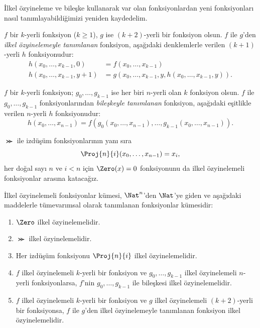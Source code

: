 \documentclass[../../../include/open-logic-section]{subfiles}
\begin{document}

İlkel özyineleme ve bileşke kullanarak var olan fonksiyonlardan yeni
fonksiyonları nasıl tanımlayabildiğimizi yeniden kaydedelim.

\begin{defn}
  $f$ bir $k$-yerli fonksiyon ($k\geq1$), $g$ ise $(k+2)$-yerli bir
  fonksiyon olsun. $f$ ile $g$'den \emph{ilkel özyinelemeyle tanımlanan}
  fonksiyon, aşağıdaki denklemlerle verilen $(k+1)$-yerli $h$ fonksiyonudur:
  \begin{align*}
    h(x_0,\dots,x_{k-1},0) & = f(x_0,\dots,x_{k-1}) \\
    h(x_0,\dots,x_{k-1},y+1) & =
      g(x_0,\dots,x_{k-1},y,h(x_0,\dots,x_{k-1},y)).
  \end{align*}
\end{defn}

\begin{defn}
  $f$ bir $k$-yerli fonksiyon; $g_0,\dots,g_{k-1}$ ise her biri $n$-yerli
  olan $k$ fonksiyon olsun. $f$ ile $g_0,\dots,g_{k-1}$ fonksiyonlarından
  \emph{bileşkeyle tanımlanan} fonksiyon, aşağıdaki eşitlikle verilen
  $n$-yerli $h$ fonksiyonudur:
  \[
    h(x_0,\dots,x_{n-1})=
    f(g_0(x_0,\dots,x_{n-1}),\dots,g_{k-1}(x_0,\dots,x_{n-1})).
  \]
\end{defn}

$\Succ$ ile izdüşüm fonksiyonlarının yanı sıra
\[
  \Proj{n}{i}(x_0,\dots,x_{n-1})=x_i,
\]
her doğal sayı $n$ ve $i<n$ için $\Zero(x)=0$ fonksiyonunu da ilkel
özyinelemeli fonksiyonlar arasına katacağız.

\begin{defn}
  İlkel özyinelemeli fonksiyonlar kümesi, $\Nat^n$'den $\Nat$'ye giden ve
  aşağıdaki maddelerle tümevarımsal olarak tanımlanan fonksiyonlar kümesidir:
  \begin{enumerate}
  \item $\Zero$ ilkel özyinelemelidir.
  \item $\Succ$ ilkel özyinelemelidir.
  \item Her izdüşüm fonksiyonu $\Proj{n}{i}$ ilkel özyinelemelidir.
  \item $f$ ilkel özyinelemeli $k$-yerli bir fonksiyon ve
    $g_0,\dots,g_{k-1}$ ilkel özyinelemeli $n$-yerli fonksiyonlarsa,
    $f$'nin $g_0,\dots,g_{k-1}$ ile bileşkesi ilkel özyinelemelidir.
  \item $f$ ilkel özyinelemeli $k$-yerli bir fonksiyon ve $g$ ilkel
    özyinelemeli $(k+2)$-yerli bir fonksiyonsa, $f$ ile $g$'den ilkel
    özyinelemeyle tanımlanan fonksiyon ilkel özyinelemelidir.
  \end{enumerate}
\end{defn}
\end{document}
